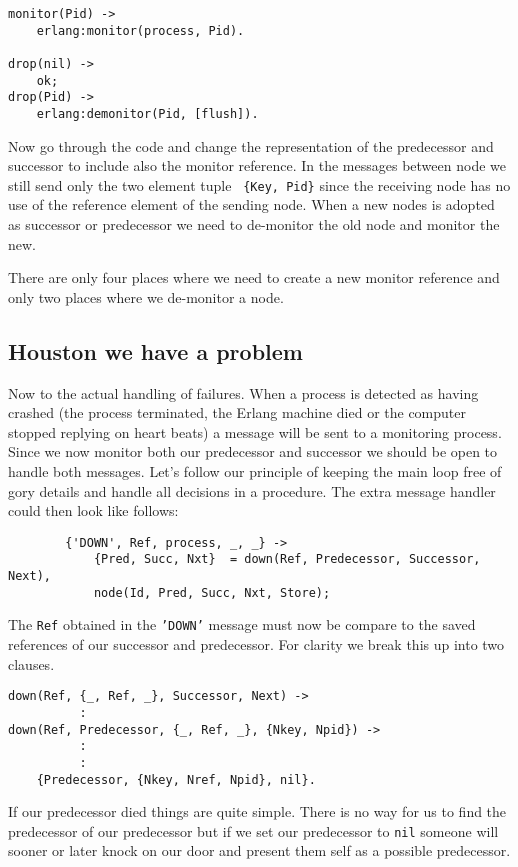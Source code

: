 \documentclass[a4paper,11pt]{article}
\begin{document}
\begin{verbatim}
monitor(Pid) ->
    erlang:monitor(process, Pid).

drop(nil) ->
    ok;
drop(Pid) ->
    erlang:demonitor(Pid, [flush]).
\end{verbatim}

Now go through the code and change the representation of the
predecessor and successor to include also the monitor reference. In the
messages between node we still send only the two element tuple {\tt
  \{Key, Pid\}} since the receiving node has no use of the reference
element of the sending node. When a new nodes is adopted as successor
or predecessor we need to de-monitor the old node and monitor the new.

There are only four places where we need to create a new monitor
reference and only two places where we de-monitor a node. 

\subsection{Houston we have a problem}

Now to the actual handling of failures. When a process is detected as
having crashed (the process terminated, the Erlang machine died or the
computer stopped replying on heart beats) a message will be sent to a
monitoring process. Since we now monitor both our predecessor and
successor we should be open to handle both messages. Let's follow our
principle of keeping the main loop free of gory details and handle all
decisions in a procedure. The extra message handler could then look
like follows:

\begin{verbatim}
        {'DOWN', Ref, process, _, _} ->
            {Pred, Succ, Nxt}  = down(Ref, Predecessor, Successor, Next),
            node(Id, Pred, Succ, Nxt, Store);
\end{verbatim}

The {\tt Ref} obtained in the {\tt 'DOWN'} message must now be compare
to the saved references of our successor and predecessor. For clarity we
break this up into two clauses.

\begin{verbatim}
down(Ref, {_, Ref, _}, Successor, Next) ->
          :
down(Ref, Predecessor, {_, Ref, _}, {Nkey, Npid}) ->
          :
          :
    {Predecessor, {Nkey, Nref, Npid}, nil}.
\end{verbatim}

If our predecessor died things are quite simple. There is no way for us
to find the predecessor of our predecessor but if we set our
predecessor to {\tt nil} someone will sooner or later knock on our
door and present them self as a possible predecessor. 
\end{document}
